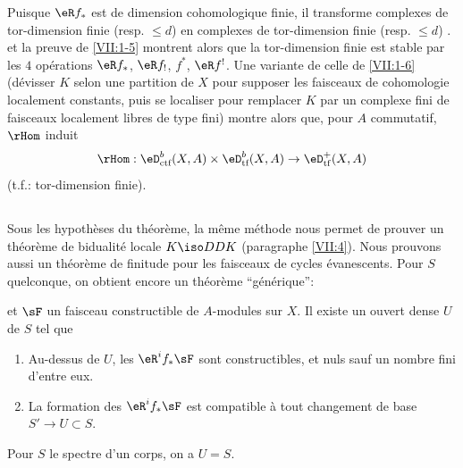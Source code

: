 Puisque $\eR f_\ast$ est de dimension cohomologique finie, il transforme 
complexes de tor-dimension finie (resp. $\leqslant d$) en complexes de 
tor-dimension finie (resp. $\leqslant d$) . 
 et la preuve de \ref{VII:1-5} montrent alors que la 
tor-dimension finie est stable par les $4$ opérations $\eR f_\ast$, 
$\eR f_!$, $f^\ast$, $\eR f^!$. Une variante de celle de \ref{VII:1-6} 
(dévisser $K$ selon une partition de $X$ pour supposer les faisceaux de 
cohomologie localement constants, puis se localiser pour remplacer $K$ par un 
complexe fini de faisceaux localement libres de type fini) montre alors que, 
pour $A$ commutatif, $\rHom$ induit 
\[
  \rHom:\eD_\text{ctf}^b(X,A)\times \eD_\text{tf}^b(X,A) \to \eD_\text{tf}^+(X,A) 
\]
(t.f.: tor-dimension finie). 





\subsection{}\label{VII:1-8}

Sous les hypothèses du théorème, la même méthode nous permet de 
prouver un théorème de bidualité locale $K\iso D D K$ (paragraphe 
\ref{VII:4}). Nous prouvons aussi un théorème de finitude pour les 
faisceaux de cycles évanescents. Pour $S$ quelconque, on obtient encore un 
théorème ``générique'': 





\begin{theorem_}\label{VII:1-9}
 et $\sF$ un faisceau 
constructible de $A$-modules sur $X$. Il existe un ouvert dense $U$ de $S$ tel 
que 
\begin{enumerate}[\indent (i)]
  \item Au-dessus de $U$, les $\eR^i f_\ast \sF$ sont constructibles, et nuls 
    sauf un nombre fini d'entre eux. 
  \item La formation des $\eR^i f_\ast \sF$ est compatible à tout 
    changement de base $S' \to U\subset S$. 
\end{enumerate}
\end{theorem_}

Pour $S$ le spectre d'un corps, on a $U=S$. 

